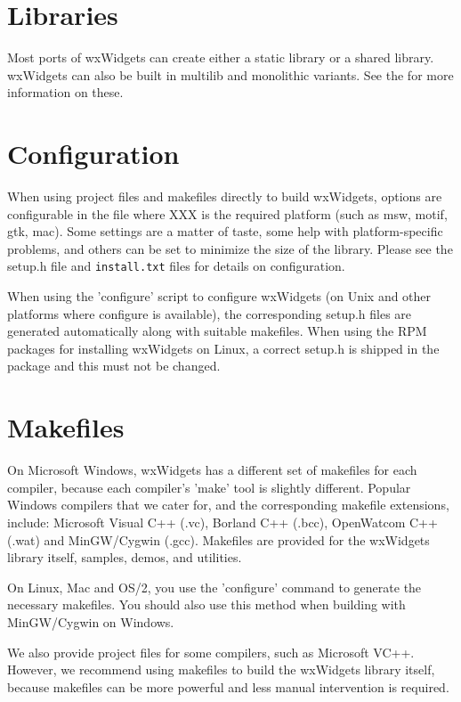 \section{Libraries}\label{libraries}

Most ports of wxWidgets can create either a static library or a shared
library. wxWidgets can also be built in multilib and monolithic variants.
See the  for more
information on these.

\section{Configuration}\label{configuration}

When using project files and makefiles directly to build wxWidgets,
options are configurable in the file
 where XXX is the required platform (such as msw, motif, gtk, mac). Some 
settings are a matter of taste, some help with platform-specific problems, and
others can be set to minimize the size of the library. Please see the setup.h file
and {\tt install.txt} files for details on configuration.

When using the 'configure' script to configure wxWidgets (on Unix and other platforms where
configure is available), the corresponding setup.h files are generated automatically
along with suitable makefiles. When using the RPM packages
for installing wxWidgets on Linux, a correct setup.h is shipped in the package and
this must not be changed.

\section{Makefiles}\label{makefiles}

On Microsoft Windows, wxWidgets has a different set of makefiles for each
compiler, because each compiler's 'make' tool is slightly different.
Popular Windows compilers that we cater for, and the corresponding makefile
extensions, include: Microsoft Visual C++ (.vc), Borland C++ (.bcc),
OpenWatcom C++ (.wat) and MinGW/Cygwin (.gcc). Makefiles are provided
for the wxWidgets library itself, samples, demos, and utilities.

On Linux, Mac and OS/2, you use the 'configure' command to
generate the necessary makefiles. You should also use this method when
building with MinGW/Cygwin on Windows.

We also provide project files for some compilers, such as
Microsoft VC++. However, we recommend using makefiles
to build the wxWidgets library itself, because makefiles
can be more powerful and less manual intervention is required.


